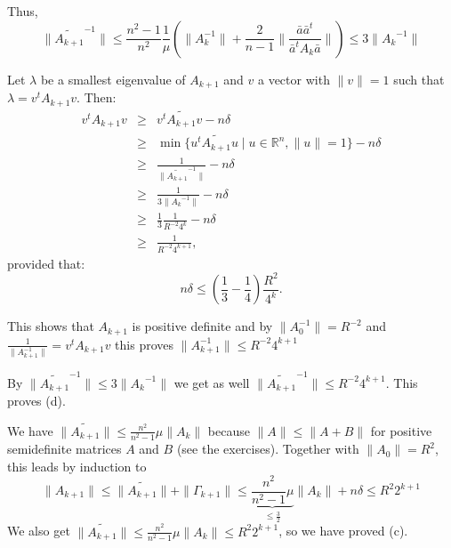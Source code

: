 \documentclass[12pt, showidx, twoside]{article}
\def\R{\mathbb{R}}
\begin{document}
{{{Thus,
\[ \| \widetilde{A_{k+1}}^{-1} \| \leq \frac{n^2 - 1}{n^2} \frac{1}{\mu} \left(\| A_k^{-1} \| 
                           + \frac{2}{n-1} \| \frac{\bar a \bar a^t}{\bar a^t A_k \bar a} \| \right)
                    \leq 3  \| {A_{k}}^{-1} \|
\]



Let $\lambda$ be a smallest eigenvalue of $A_{k+1}$ and $v$ a vector
with $\|v\| = 1$ such that $\lambda = v^t A_{k+1} v$. Then:
\begin{eqnarray*}
          v^t A_{k+1} v 
               & \geq & v^t \widetilde{A_{k+1}} v - n\delta \\
               & \geq & \min \{ u^t \widetilde{A_{k+1}} u \mid u \in \R^n, \|u\|=1   \} - n\delta \\
               & \geq & \frac{1}{\| \widetilde{A_{k+1}}^{-1} \|} -n \delta \\
               & \geq & \frac{1}{3\| {A_{k}}^{-1} \|} -n \delta \\
               & \geq & \frac{1}{3} \frac{1}{R^{-2} 4^{k}} -n \delta \\
               & \geq & \frac{1}{R^{-2} 4^{k+1}},
\end{eqnarray*}
provided that:
\begin{equation}
n \delta \leq \left(\frac{1}{3}-\frac{1}{4} \right) \frac{R^2}{4^{k}}.
\end{equation}

This shows that $A_{k+1}$ is positive definite 
and by  
$\| A_0^{-1} \| = R^{-2}$ and $\frac{1}{\| A_{k+1} ^{-1}\|} = v^t A_{k+1} v$
this proves $\| A_{k+1} ^{-1}\| \leq {R^{-2} 4^{k+1}}$ 


By
$ \| \widetilde{A_{k+1}}^{-1} \| \leq 3  \| {A_{k}}^{-1} \|$
we get as well $ \| \widetilde{A_{k+1}}^{-1} \| \leq {R^{-2} 4^{k+1}}$.
This proves (d).




We have $\| \widetilde{A_{k+1}}\| \leq \frac{n^2}{n^2 - 1} \mu \|A_{k}\|$
because $\|A\| \leq \|A + B\|$ for positive semidefinite matrices $A$ and $B$
(see the exercises). Together with $\|A_0\| = R^2$, this leads by induction to
\[
    \|A_{k+1}\| \leq \| \widetilde{A_{k+1}}\| + \|\Gamma_{k+1}\| 
               \leq \underbrace{\frac{n^2}{n^2 - 1} \mu}_{\leq \frac{3}{2}} \|A_{k}\| + n\delta
               \leq R^2 2^{k+1}
\]
We also get $\| \widetilde{A_{k+1}}\| \leq \frac{n^2}{n^2 - 1} \mu \|A_{k}\|
\leq R^2 2^{k+1}$, so we have proved (c).

}}}
\end{document}
